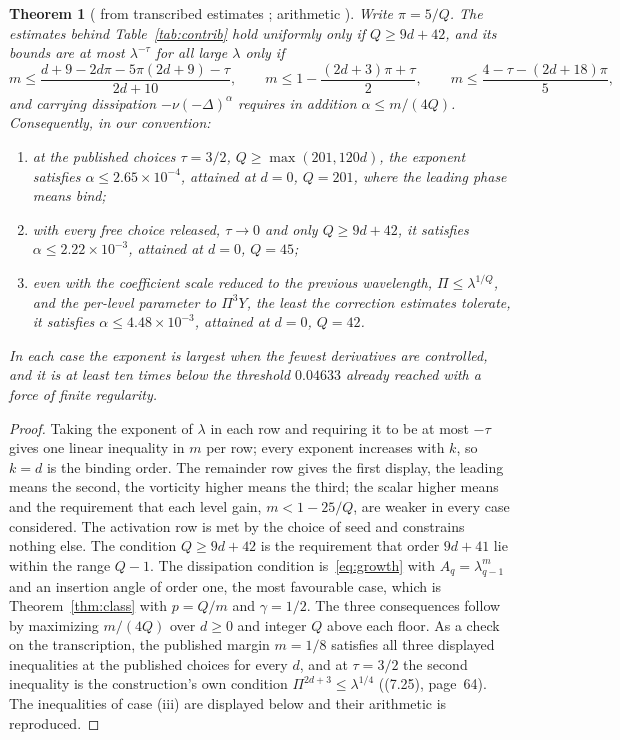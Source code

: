 \documentclass[11pt]{article}
\newtheorem{theorem}{Theorem}[section]
\theoremstyle{remark}
\newcommand{\ev}[1]{\hspace{0.2em}{\small\textsf{[#1]}}}
\begin{document}
\begin{theorem}[\ev{D} from transcribed estimates \ev{V}; arithmetic \ev{MV}]\label{thm:design}
Write $\pi=5/Q$. The estimates behind Table~\ref{tab:contrib} hold uniformly only if $Q\ge9d+42$, and its bounds
are at most $\lambda^{-\tau}$ for all large $\lambda$ only if
\[
m\le\frac{d+9-2d\pi-5\pi(2d+9)-\tau}{2d+10},\qquad
m\le1-\frac{(2d+3)\pi+\tau}{2},\qquad
m\le\frac{4-\tau-(2d+18)\pi}{5},
\]
and carrying dissipation $-\nu(-\Delta)^{\alpha}$ requires in addition $\alpha\le m/(4Q)$.
Consequently, in our convention:
\begin{enumerate}
\item[(i)] at the published choices $\tau=3/2$, $Q\ge\max(201,120d)$, the exponent satisfies
$\alpha\le2.65\times10^{-4}$, attained at $d=0$, $Q=201$, where the leading phase means bind;
\item[(ii)] with every free choice released, $\tau\to0$ and only $Q\ge9d+42$, it satisfies
$\alpha\le2.22\times10^{-3}$, attained at $d=0$, $Q=45$;
\item[(iii)] even with the coefficient scale reduced to the previous wavelength, $\Pi\le\lambda^{1/Q}$,
and the per-level parameter to $\Pi^{3}Y$, the least the correction estimates tolerate, it satisfies
$\alpha\le4.48\times10^{-3}$, attained at $d=0$, $Q=42$.
\end{enumerate}
In each case the exponent is largest when the fewest derivatives are controlled, and it is at least
ten times below the threshold $0.04633$ already reached with a force of finite regularity.
\end{theorem}

\begin{proof}
Taking the exponent of $\lambda$ in each row and requiring it to be at most $-\tau$ gives one linear
inequality in $m$ per row; every exponent increases with $k$, so $k=d$ is the binding order. The
remainder row gives the first display, the leading means the second, the vorticity higher means the
third; the scalar higher means and the requirement that each level gain, $m<1-25/Q$, are weaker in
every case considered. The activation row is met by the choice of seed and constrains nothing
else. The condition $Q\ge9d+42$ is the requirement that order $9d+41$ lie within the range $Q-1$. The
dissipation condition is~\eqref{eq:growth} with $A_{q}=\lambda_{q-1}^{m}$ and an insertion angle of
order one, the most favourable case, which is Theorem~\ref{thm:class} with $p=Q/m$ and $\gamma=1/2$.
The three consequences follow by maximizing $m/(4Q)$ over $d\ge0$ and integer $Q$ above each floor.
As a check on the transcription, the published margin $m=1/8$ satisfies all three displayed
inequalities at the published choices for every $d$, and at $\tau=3/2$ the second inequality is the
construction's own condition $\Pi^{2d+3}\le\lambda^{1/4}$ ((7.25), page~64). The inequalities of
case (iii) are displayed below and their arithmetic is reproduced.
\end{proof}
\end{document}
